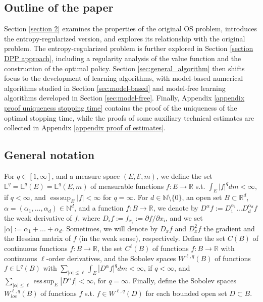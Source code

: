 \documentclass[11pt]{amsart}
\theoremstyle{plain}
\def \R{\mathbb{R}}
\DeclareMathOperator*{\esssup}{ess\,sup}
\numberwithin{equation}{section}
\begin{document}
\subsection{Outline of the paper} 
Section \ref{section 2} examines the properties of the original OS problem, introduces the entropy-regularized version, and explores its relationship with the original problem. The entropy-regularized problem is further explored in Section \ref{section DPP approach}, including a regularity analysis of the value function and the construction of the optimal policy.  
Section \ref{sec:general_algorithm} then shifts focus to the development of learning algorithms, with model-based numerical algorithms studied in Section \ref{sec:model-based} and model-free learning algorithms developed in Section \ref{sec:model-free}.
Finally, Appendix \ref{appendix proof uniqueness stopping time} contains the proof of the uniqueness of the optimal stopping time, while the proofs of some auxiliary technical estimates are collected in Appendix \ref{appendix proof of estimates}.

\subsection{General notation}
For $q\in [1,\infty]$, and a measure space $(E, \mathcal{E}, m)$, we define    
 the set $\mathbb L^q= \mathbb L^q(E)=\mathbb L^q(E,m)$ of measurable functions $f:E\to \mathbb{R}$  s.t. $\int_E |f|^q dm < \infty$, if $q <\infty$, and $\esssup_E |f| < \infty$ for $q=\infty$.
For $d \in \mathbb{N} \setminus \{0\}$, an open set $B \subset \mathbb{R}^d$, $\alpha=(\alpha_1,...,\alpha_{d})\in \mathbb{N}^{d}$, and a function $f:B \to \mathbb{R}$, we denote by $D^\alpha f:= D_1^{\alpha_1} ... D_{d}^{\alpha_{d}} f$ the weak derivative of $f$, where $D_i f:=f_{x_i} := \partial f / \partial x_i$, and we set $|\alpha|:=\alpha_1 + ... +\alpha_d$. 
Sometimes, we will denote by $D_x f$ and $D_x^2f$ the gradient and the Hessian matrix of $f$ (in the weak sense), respectively.
Define the set $C(B)$  of continuous functions $f:B\to \R$,  the set  $C^{\ell }(B)$  of functions $f:B\to \R$ with continuous $\ell$-order derivatives,
and the Sobolev spaces ${W}^{\ell,q}(B)$ of functions $f \in \mathbb L^q(B)$ with $\sum_{|\alpha| \leq \ell} \int_E |D^{\alpha} f|^q dm< \infty$, if $q <\infty$, and $\sum_{|\alpha| \leq \ell} \esssup_E |D^{\alpha} f| < \infty$, for $q=\infty$.
Finally, define the Sobolev spaces ${W}_{loc}^{\ell,q}(B)$ of functions $f$ s.t. $f \in  {W}^{\ell,q}(D)$ for each bounded open set $D\subset B$.
\end{document}
